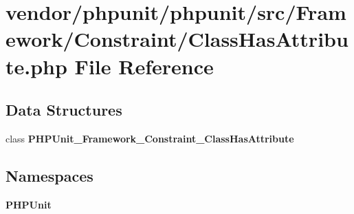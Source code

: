 \section{vendor/phpunit/phpunit/src/\+Framework/\+Constraint/\+Class\+Has\+Attribute.php File Reference}
\label{_class_has_attribute_8php}
\subsection*{Data Structures}
\begin{DoxyCompactItemize}
\item 
class {\bf P\+H\+P\+Unit\+\_\+\+Framework\+\_\+\+Constraint\+\_\+\+Class\+Has\+Attribute}
\end{DoxyCompactItemize}
\subsection*{Namespaces}
\begin{DoxyCompactItemize}
\item 
 {\bf P\+H\+P\+Unit}
\end{DoxyCompactItemize}
